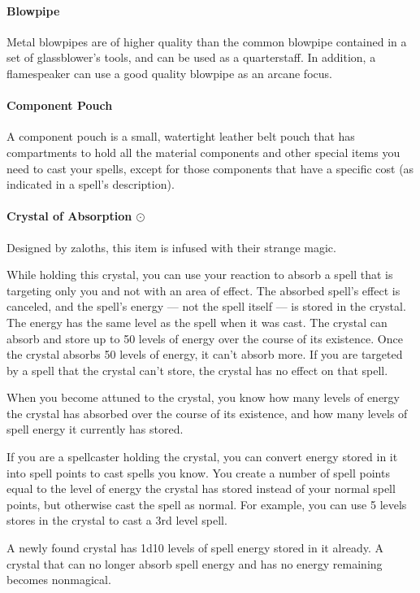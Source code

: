     \paragraph{Blowpipe}
        Metal blowpipes are of higher quality than the common blowpipe contained in a set of glassblower's tools, and can be used as a quarterstaff.
        In addition, a flamespeaker can use a good quality blowpipe as an arcane focus.
    \paragraph{Component Pouch}
        A component pouch is a small, watertight leather belt pouch that has compartments to hold all the material components and other special items you need to cast your spells, except for those components that have a specific cost (as indicated in a spell's description).
    \paragraph{Crystal of Absorption $\odot$}
        Designed by zaloths, this item is infused with their strange magic.

        While holding this crystal, you can use your reaction to absorb a spell that is targeting only you and not with an area of effect.
        The absorbed spell's effect is canceled, and the spell's energy --- not the spell itself --- is stored in the crystal.
        The energy has the same level as the spell when it was cast.
        The crystal can absorb and store up to 50 levels of energy over the course of its existence.
        Once the crystal absorbs 50 levels of energy, it can't absorb more.
        If you are targeted by a spell that the crystal can't store, the crystal has no effect on that spell.

        When you become attuned to the crystal, you know how many levels of energy the crystal has absorbed over the course of its existence, and how many levels of spell energy it currently has stored.

        If you are a spellcaster holding the crystal, you can convert energy stored in it into spell points to cast spells you know.
        You create a number of spell points equal to the level of energy the crystal has stored instead of your normal spell points, but otherwise cast the spell as normal.
        For example, you can use 5 levels stores in the crystal to cast a 3rd level spell.

        A newly found crystal has 1d10 levels of spell energy stored in it already.
        A crystal that can no longer absorb spell energy and has no energy remaining becomes nonmagical.
